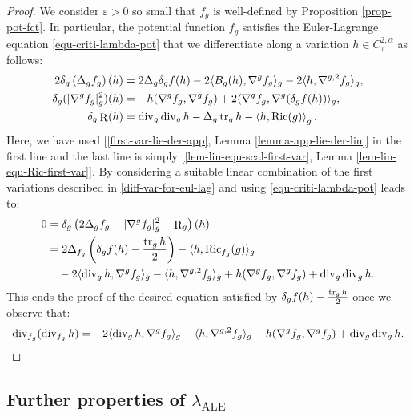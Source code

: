 \documentclass[a4paper,11pt,reqno]{amsart}
\def\Ric{\mathop{\rm Ric}\nolimits}
\def\tr{\mathop{\rm tr}\nolimits}
\def\div{\mathop{\rm div}\nolimits}
\def\Ric{\mathop{\rm Ric}\nolimits}
\def\tr{\mathop{\rm tr}\nolimits}
\def\div{\mathop{\rm div}\nolimits}
\def\R{\mathop{\rm R}\nolimits}
\numberwithin{equation}{section}
\begin{document}
		\begin{proof}
		We consider $\varepsilon>0$ so small that $f_g$ is well-defined by Proposition \ref{prop-pot-fct}. In particular, the potential function $f_g$ satisfies the Euler-Lagrange equation \eqref{equ-criti-lambda-pot} that we differentiate along a variation $h\in C^{2,\alpha}_{\tau}$ as follows:
		\begin{equation}
		\begin{split}\label{diff-var-for-eul-lag}
2\delta_g\left(\Delta_gf_g\right)(h)&=2\Delta_g\delta_gf(h)-2\langle B_g(h),\nabla^gf_g\rangle_g-2\langle h,\nabla^{g,2}f_g\rangle_g,\\
\delta_g(|\nabla^gf_g|^2_g)(h)&=-h(\nabla^gf_g,\nabla^gf_g)+2\langle\nabla^gf_g,\nabla^g(\delta_gf(h))\rangle_g,\\
\delta_g\R(h)&=\div_{g}\div_{g}h-\Delta_{g}\tr_gh-\left<h,\Ric(g)\right>_g.
\end{split}
\end{equation}
Here, we have used [\eqref{first-var-lie-der-app}, Lemma \ref{lemma-app-lie-der-lin}] in the first line and the last line is simply [\eqref{lem-lin-equ-scal-first-var}, Lemma \ref{lem-lin-equ-Ric-first-var}]. By considering a suitable linear combination of the first variations described in \eqref{diff-var-for-eul-lag} and using \eqref{equ-criti-lambda-pot} leads to:
\begin{equation*}
\begin{split}
0&=\delta_g\left(2\Delta_gf_g-|\nabla^gf_g|^2_g+\R_g\right)(h)\\
&=2\Delta_{f_g}\left(\delta_gf(h)-\frac{\tr_gh}{2}\right)-\langle h,\Ric_{f_g}(g)\rangle_g\\
&\quad-2\langle \div_gh,\nabla^gf_g\rangle_g-\langle h,\nabla^{g,2}f_g\rangle_g+h(\nabla^gf_g,\nabla^gf_g)+\div_g\div_gh.
\end{split}
\end{equation*}
This ends the proof of the desired equation satisfied by $\delta_gf(h)-\frac{\tr_gh}{2}$ once we observe that:
\begin{equation*}
\div_{f_g}(\div_{f_g}h)=-2\langle \div_gh,\nabla^gf_g\rangle_g-\langle h,\nabla^{g,2}f_g\rangle_g+h(\nabla^gf_g,\nabla^gf_g)+\div_g\div_gh.
\end{equation*}

		\end{proof}
		\subsection{Further properties of $\lambda_{\operatorname{ALE}}$}~~\\
		
\end{document}
